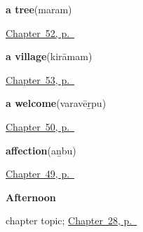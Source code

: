 \noindent\begin{minipage}[t]{\linewidth}
\raggedright
\textbf{a tree}\enspace\emph{}\enspace(maram)\par
\footnotesize \hyperref[ch:ta-a-tree]{Chapter~52, p.~\pageref*{ch:ta-a-tree}}
\end{minipage}\par\smallskip

\noindent\begin{minipage}[t]{\linewidth}
\raggedright
\textbf{a village}\enspace\emph{}\enspace(kirāmam)\par
\footnotesize \hyperref[ch:ta-the-land]{Chapter~53, p.~\pageref*{ch:ta-the-land}}
\end{minipage}\par\smallskip

\noindent\begin{minipage}[t]{\linewidth}
\raggedright
\textbf{a welcome}\enspace\emph{}\enspace(varavēṟpu)\par
\footnotesize \hyperref[ch:ta-at-the-doorway]{Chapter~50, p.~\pageref*{ch:ta-at-the-doorway}}
\end{minipage}\par\smallskip

\noindent\begin{minipage}[t]{\linewidth}
\raggedright
\textbf{affection}\enspace\emph{}\enspace(aṉbu)\par
\footnotesize \hyperref[ch:ta-courtesy]{Chapter~49, p.~\pageref*{ch:ta-courtesy}}
\end{minipage}\par\smallskip

\noindent\begin{minipage}[t]{\linewidth}
\raggedright
\textbf{Afternoon}\par
\footnotesize chapter topic; \hyperref[ch:ta-afternoon]{Chapter~28, p.~\pageref*{ch:ta-afternoon}}
\end{minipage}\par\smallskip


